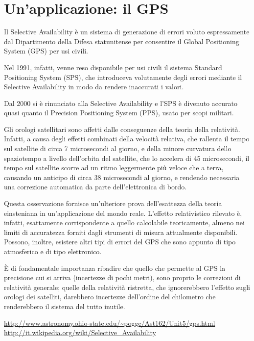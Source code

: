 \section{Un'applicazione: il GPS}

Il Selective Availability è un sistema di generazione di errori voluto espressamente dal Dipartimento della Difesa 
statunitense per consentire il Global Positioning System (GPS) per usi civili.

Nel 1991, infatti, venne reso disponibile per usi civili il sistema Standard Positioning System (SPS), 
che introduceva volutamente degli errori mediante il Selective Availability in modo da rendere inaccurati i valori.

Dal 2000 si è rinunciato alla Selective Availability e l'SPS è divenuto accurato quasi quanto il 
Precision Positioning System (PPS), usato per scopi militari.

Gli orologi satellitari sono affetti dalle conseguenze della teoria della relatività. 
Infatti, a causa degli effetti combinati della velocità relativa, che rallenta il tempo sul satellite di circa 
7 microsecondi al giorno, e della minore curvatura dello spaziotempo a livello dell'orbita del satellite, 
che lo accelera di 45 microsecondi, il tempo sul satellite scorre ad un ritmo leggermente più veloce che a terra, 
causando un anticipo di circa 38 microsecondi al giorno, e rendendo necessaria una correzione automatica da parte 
dell'elettronica di bordo. 

Questa osservazione fornisce un'ulteriore prova dell'esattezza della teoria einsteniana 
in un'applicazione del mondo reale. L'effetto relativistico rilevato è, infatti, esattamente corrispondente a quello 
calcolabile teoricamente, almeno nei limiti di accuratezza forniti dagli strumenti di misura 
attualmente disponibili. Possono, inoltre, esistere altri tipi di errori del GPS che sono appunto 
di tipo atmosferico e di tipo elettronico.

È di fondamentale importanza ribadire che quello che permette al GPS la precisione cui 
si arriva (incertezze di pochi metri), sono proprio le correzioni di relatività generale; 
quelle della relatività ristretta, che ignorerebbero l'effetto sugli orologi dei satelliti, 
darebbero incertezze dell'ordine del chilometro che renderebbero il sistema del tutto inutile.

\url{http://www.astronomy.ohio-state.edu/~pogge/Ast162/Unit5/gps.html}
\url{http://it.wikipedia.org/wiki/Selective_Availability}

